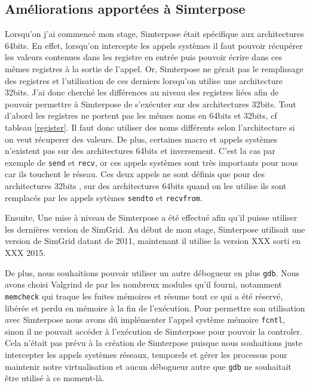 \subsection{Améliorations apportées à Simterpose}

Lorsqu'on j'ai commencé mon stage, Simterpose était spécifique aux architectures 64bits. En effet, lorsqu'on intercepte les appels systèmes il faut pouvoir récupérer les valeurs contenues dans les registre en entrée puis pouvoir écrire dans ces mêmes registres à la sortie de l'appel. Or, Simterpose ne gérait pas le remplissage des registres et l'utilisation de ces derniers lorsqu'on utilise une architecture 32bits. J'ai donc cherché les différences au niveau des registres liées afin de pouvoir permettre à Simterpose de s'exécuter sur des architectures 32bits. Tout d'abord les registres ne portent pas les mêmes noms en 64bits et 32bits, cf tableau \ref{register}. Il faut donc utiliser des noms différents selon l'architecture si on veut récuperer des valeurs. De plus, certaines macro et appels systèmes n'existent pas sur des architectures 64bits et inversement. C'est la cas par exemple de \texttt{send} et \texttt{recv}, or ces appels systèmes sont très importants pour nous car ils touchent le réseau. Ces deux appels ne sont définis que pour des architectures 32bits , sur des architectures 64bits quand on les utilise ils sont remplacés par les appels sytèmes \texttt{sendto} et \texttt{recvfrom}.

Ensuite, Une mise à niveau de Simterpose a été effectué afin qu'il puisse utiliser les dernières version de SimGrid. Au début de mon stage, Simterpose utilisait une version de SimGrid datant de 2011, maintenant il utilise la version  {\color{red}XXX} sorti en {\color{red}XXX} 2015.

De plus, nous souhaitions pouvoir utiliser un autre {\color{red}débogueur} en plus \texttt{gdb}. Nous avons choisi Valgrind de par les nombreux modules qu'il fourni, notamment \texttt{memcheck} qui traque les fuites mémoires et résume tout ce qui a été réservé, libérée et perdu en mémoire à la fin de l'exécution. Pour permettre son utilisation avec Simterpose nous avons dû implémenter l'appel système mémoire \texttt{fcntl}, sinon il ne pouvait accéder à l'exécution de Simterpose pour pouvoir la controler. Cela n'était pas prévu à la création de Simterpose puisque nous souhaitions juste intercepter les appels systèmes réseaux, temporels et gérer les processus pour maintenir notre virtualisation et aucun  {\color{red}débogueur} autre que \texttt{gdb} ne souhaitait être utilisé à ce moment-là.

